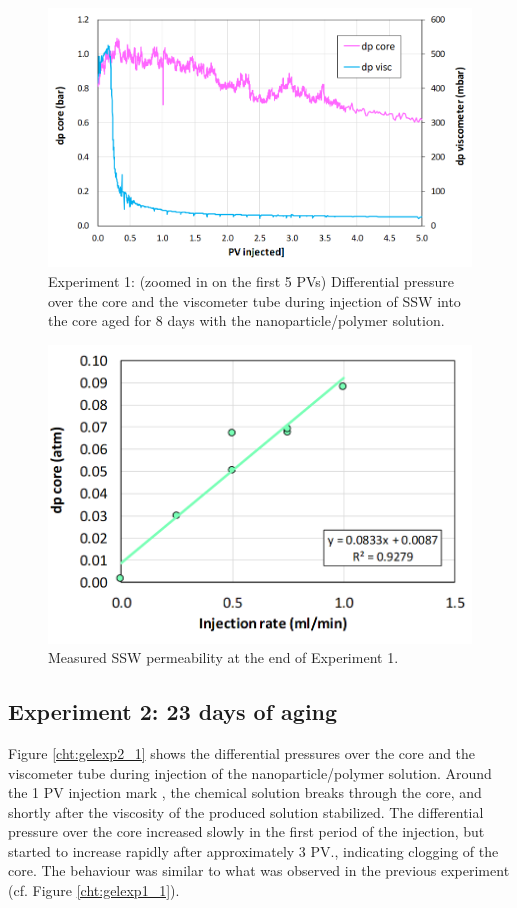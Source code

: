 \begin{figure}[h!]
    \centering
    \includegraphics[width=\textwidth]{img/cht/gelexp1_3.png}
    \caption{Experiment 1: (zoomed in on the first 5 PVs) Differential pressure over the core and the viscometer tube during injection of SSW into the core aged for 8 days with the nanoparticle/polymer solution.}
    \label{cht:gelexp1_3} %
\end{figure}

\begin{figure}[h!]
    \centering
    \includegraphics[width=.9\textwidth]{img/cht/gelexp1_4.png}
    \caption{Measured SSW permeability at the end of Experiment 1.}
    \label{cht:gelexp1_4} %
\end{figure}

\FloatBarrier
\subsection{Experiment 2: 23 days of aging}
Figure \ref{cht:gelexp2_1} shows the differential pressures over the core and the viscometer tube during injection of the nanoparticle/polymer solution. Around the 1 PV injection mark , the chemical solution breaks through the core, and shortly after the viscosity of the produced solution stabilized. The differential pressure over the core increased slowly in the first period of the injection, but started to increase rapidly after approximately 3 PV., indicating clogging of the core. The behaviour was similar to what was observed in the previous experiment (cf. Figure \ref{cht:gelexp1_1}).

